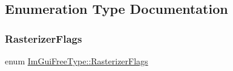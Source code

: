 \subsection{Enumeration Type Documentation}
\mbox{\label{namespace_im_gui_free_type_a2f8e91ffa41706b44072258dcff5696f}} 
\subsubsection{\texorpdfstring{Rasterizer\+Flags}{RasterizerFlags}}
{\footnotesize\ttfamily enum \mbox{\hyperlink{namespace_im_gui_free_type_a2f8e91ffa41706b44072258dcff5696f}{Im\+Gui\+Free\+Type\+::\+Rasterizer\+Flags}}}

